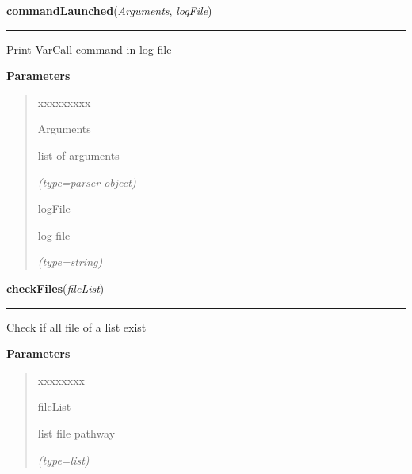\hspace{.8\funcindent}\begin{boxedminipage}{\funcwidth}

    \raggedright \textbf{commandLaunched}(\textit{Arguments}, \textit{logFile})

    \vspace{-1.5ex}

    \rule{\textwidth}{0.5\fboxrule}
\setlength{\parskip}{2ex}
    Print VarCall command in log file

\setlength{\parskip}{1ex}
      \textbf{Parameters}
      \vspace{-1ex}

      \begin{quote}
        \begin{Ventry}{xxxxxxxxx}

          \item[Arguments]

          list of arguments

            {\it (type=parser object)}

          \item[logFile]

          log file

            {\it (type=string)}

        \end{Ventry}

      \end{quote}

    \end{boxedminipage}

    \label{script-VARCall:checkFiles}

    \vspace{0.5ex}

\hspace{.8\funcindent}\begin{boxedminipage}{\funcwidth}

    \raggedright \textbf{checkFiles}(\textit{fileList})

    \vspace{-1.5ex}

    \rule{\textwidth}{0.5\fboxrule}
\setlength{\parskip}{2ex}
    Check if all file of a list exist

\setlength{\parskip}{1ex}
      \textbf{Parameters}
      \vspace{-1ex}

      \begin{quote}
        \begin{Ventry}{xxxxxxxx}

          \item[fileList]

          list file pathway

            {\it (type=list)}

        \end{Ventry}

      \end{quote}

    \end{boxedminipage}

